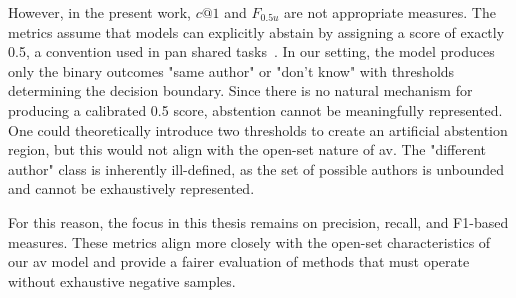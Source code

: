 However, in the present work, $c@1$ and $F_{0.5u}$ are not appropriate measures. 
The metrics assume that models can explicitly abstain by assigning a score of exactly 0.5, a convention used in \ac{pan} shared tasks~\citep{tyo_state_2022,bevendorff_overview_2024,kocher_unine_2015}. 
In our setting, the model produces only the binary outcomes "same author" or "don't know" with thresholds determining the decision boundary. 
Since there is no natural mechanism for producing a calibrated 0.5 score, abstention cannot be meaningfully represented. 
One could theoretically introduce two thresholds to create an artificial abstention region, but this would not align with the open-set nature of \ac{av}. 
The "different author" class is inherently ill-defined, as the set of possible authors is unbounded and cannot be exhaustively represented. 

For this reason, the focus in this thesis remains on precision, recall, and F1-based measures. 
These metrics align more closely with the open-set characteristics of our \ac{av} model and provide a fairer evaluation of methods that must operate without exhaustive negative samples.








